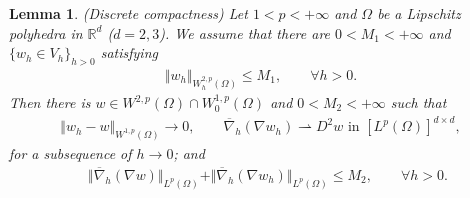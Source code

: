 \documentclass[12pt]{amsart}
\newtheorem{lemma}{Lemma}[section]
\theoremstyle{definition}
\theoremstyle{remark}
\begin{document}
\begin{lemma}
\label{lemma_conv_compactness} 
(Discrete compactness)
Let $1 < p < + \infty$ and $\Omega$ be a Lipschitz polyhedra in $\mathbb{R}^{d}$ 
($d=2,3$). We assume that there are $0 < M_{1} < +\infty$ and 
$\{w_{h} \in V_{h}\}_{h > 0}$ satisfying 
\begin{align*}
\Vert  w_{h} \Vert_{W_{h}^{2,p}(\Omega)} 
\leq M_{1}, \qquad \forall h > 0.
\end{align*} 
Then there is $w \in W^{2,p}(\Omega) \cap W_{0}^{1,p}(\Omega)$ and $ 0<M_{2}< + \infty$ 
such that 
\begin{align*}
\Vert w_{h} - w\Vert_{W^{1,p}(\Omega)} \rightarrow 0, \qquad 
\overline{\nabla}_{h}(\nabla w_{h}) \rightharpoonup D^{2}w \text{ in } 
[L^{p}(\Omega)]^{d \times d},
\end{align*}
for a subsequence of $h \rightarrow 0$; and 
\begin{align*}
\quad \Vert \overline{\nabla}_{h}(\nabla w) \Vert_{L^{p}(\Omega)} 
+ \Vert \overline{\nabla}_{h} (\nabla w_{h})\Vert_{L^{p}(\Omega)} 
\leq M_{2}, \qquad \forall h> 0.
\end{align*}
\end{lemma}
\end{document}
